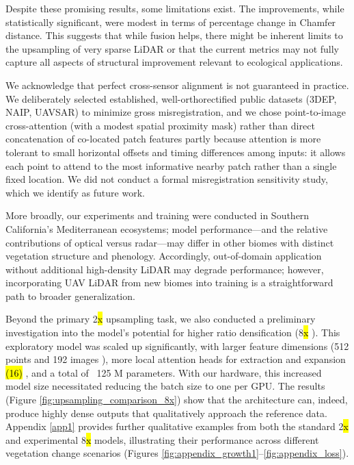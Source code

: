 \documentclass[remotesensing,article,accept,pdftex,moreauthors]{Definitions/mdpi}
\begin{document}
Despite these promising results, some limitations exist. The improvements, while statistically significant, were modest in terms of percentage change in Chamfer distance. This suggests that while fusion helps, there might be inherent limits to the upsampling of very sparse LiDAR or that the current metrics may not fully capture all aspects of structural improvement relevant to ecological applications.

We acknowledge that perfect cross-sensor alignment is not guaranteed in practice. We deliberately selected established, well-orthorectified public datasets (3DEP, NAIP, UAVSAR) to minimize gross misregistration, and we chose point-to-image cross-attention (with a modest spatial proximity mask) rather than direct concatenation of co-located patch features partly because attention is more tolerant to small horizontal offsets and timing differences among inputs: it allows each point to attend to the most informative nearby patch rather than a single fixed location. We did not conduct a formal misregistration sensitivity study, which we identify as future work.

More broadly, our experiments and training were conducted in Southern California's Mediterranean ecosystems; model performance—and the relative contributions of optical versus radar—may differ in other biomes with distinct vegetation structure and phenology. Accordingly, out-of-domain application without additional high-density LiDAR may degrade performance; however, incorporating UAV LiDAR from new biomes into training is a straightforward path to broader generalization.

Beyond the primary 2\hl{x} %
 upsampling task, we also conducted a preliminary investigation into the model's potential for higher ratio densification (8\hl{x}%
). This exploratory model was scaled up significantly, with larger feature dimensions (512 points and 192 images%
), more local attention heads for extraction and expansion \hl{(16)}%
, and a total of ~125 M parameters. With our hardware, this increased model size necessitated reducing the batch size to one per GPU. The results (Figure \ref{fig:upsampling_comparison_8x}) show that the architecture can, indeed, produce highly dense outputs that qualitatively approach the reference data. Appendix \ref{app1} provides further qualitative examples from both the standard 2\hl{x} %
 and experimental 8\hl{x} %
 models, illustrating their performance across different vegetation change scenarios (Figures \ref{fig:appendix_growth1}--\ref{fig:appendix_loss}).
\end{document}
